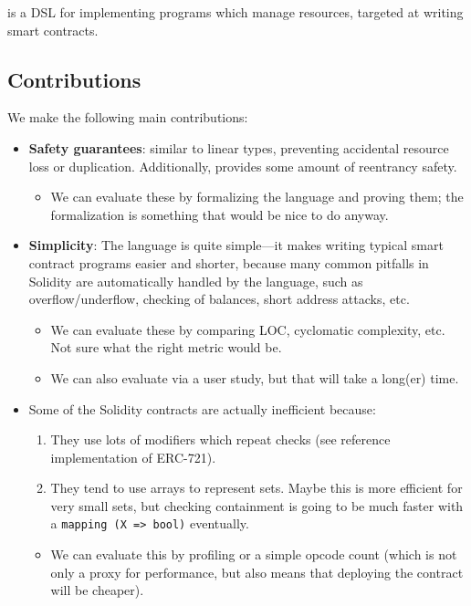 \documentclass[10pt]{article}
\begin{document}
\langName is a DSL for implementing programs which manage resources, targeted at writing smart contracts.

\subsection{Contributions}

We make the following main contributions:
\begin{itemize}
    \item \textbf{Safety guarantees}: similar to  linear types, preventing accidental resource loss or duplication.
        Additionally, provides some amount of reentrancy safety.

        \begin{itemize}
            \item We can evaluate these by formalizing the language and proving them; the formalization is something that would be nice to do anyway.
        \end{itemize}

    \item \textbf{Simplicity}: The language is quite simple---it makes writing typical smart contract programs easier and shorter, because many common pitfalls in Solidity are automatically handled by the language, such as overflow/underflow, checking of balances, short address attacks, etc.

        \begin{itemize}
            \item We can evaluate these by comparing LOC, cyclomatic complexity, etc.
                Not sure what the right metric would be.

            \item We can also evaluate via a user study, but that will take a long(er) time.
        \end{itemize}

    \item {}
        Some of the Solidity contracts are actually inefficient because:
        \begin{enumerate}
            \item They use lots of modifiers which repeat checks (see reference implementation of ERC-721).
            \item They tend to use arrays to represent sets.
                Maybe this is more efficient for very small sets, but checking containment is going to be much faster with a \lstinline{mapping (X => bool)} eventually.
        \end{enumerate}

        \begin{itemize}
            \item We can evaluate this by profiling or a simple opcode count (which is not only a proxy for performance, but also means that deploying the contract will be cheaper).
        \end{itemize}
\end{itemize}
\end{document}
